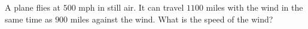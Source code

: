 A plane flies at $500$ mph in still air. It can travel $1100$ miles with the wind in the same time as $900$ miles against the wind. What is the speed of the wind?
